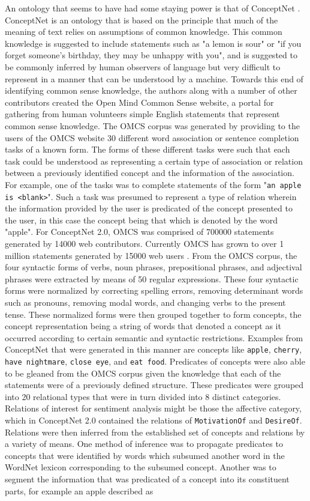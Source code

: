 \documentclass[letterpaper, 10 pt, conference]{ieeeconf}
\begin{document}
An ontology that seems to have had some staying power is that of ConceptNet \textcolor{gray}{\cite{Liu}}. ConceptNet is an ontology that is based on the principle that much of the meaning of text relies on assumptions of common knowledge. This common knowledge is suggested to include statements such as "a lemon is sour" or "if you forget someone's birthday, they may be unhappy with you", and is suggested to be commonly inferred by human observers of language but very difficult to represent in a manner that can be understood by a machine. Towards this end of identifying common sense knowledge, the authors along with a number of other contributors created the Open Mind Common Sense website, a portal for gathering from human volunteers simple English statements that represent common sense knowledge. The OMCS corpus was generated by providing to the users of the OMCS website 30 different word association or sentence completion tasks of a known form. The forms of these different tasks were such that each task could be understood as representing a certain type of association or relation between a previously identified concept and the information of the association. For example, one of the tasks was to complete statements of the form "\texttt{an apple is <blank>}". Such a task was presumed to represent a type of relation wherein the information provided by the user is predicated of the concept presented to the user, in this case the concept being that which is denoted by the word "apple". For ConceptNet 2.0, OMCS was comprised of 700000 statements generated by 14000 web contributors. Currently OMCS has grown to over 1 million statements generated by 15000 web users \textcolor{gray}{\cite{Arnold}}. From the OMCS corpus, the four syntactic forms of verbs, noun phrases, prepositional phrases, and adjectival phrases were extracted by means of 50 regular expressions. These four syntactic forms were normalized by correcting spelling errors, removing determinant words such as pronouns, removing modal words, and changing verbs to the present tense. These normalized forms were then grouped together to form concepts, the concept representation being a string of words that denoted a concept as it occurred according to certain semantic and syntactic restrictions. Examples from ConceptNet that were generated in this manner are concepts like \texttt{apple}, \texttt{cherry}, \texttt{have nightmare}, \texttt{close eye}, and \texttt{eat food}. Predicates of concepts were also able to be gleaned from the OMCS corpus given the knowledge that each of the statements were of a previously defined structure. These predicates were grouped into 20 relational types that were in turn divided into 8 distinct categories. Relations of interest for sentiment analysis might be those the affective category, which in ConceptNet 2.0 contained the relations of \texttt{MotivationOf} and \texttt{DesireOf}. Relations were then inferred from the established set of concepts and relations by a variety of means. One method of inference was to propagate predicates to concepts that were identified by words which subsumed another word in the WordNet lexicon corresponding to the subsumed concept. Another was to segment the information that was predicated of a concept into its constituent parts, for example an apple described as 
\end{document}
